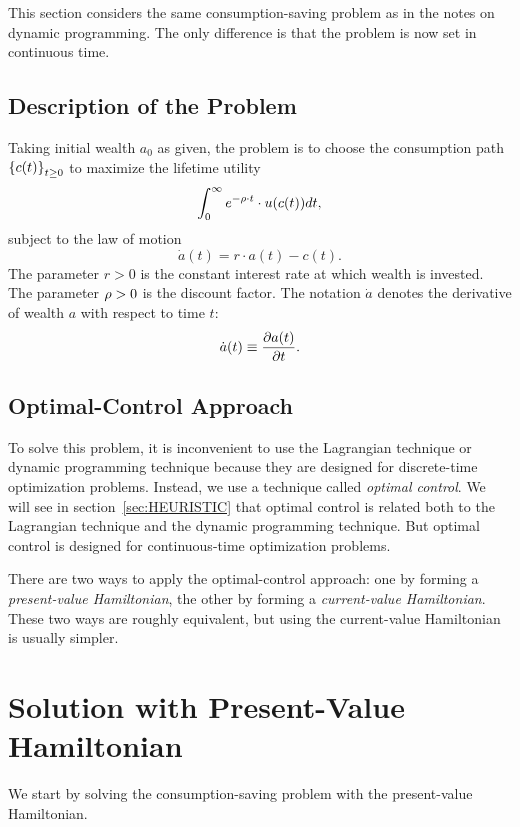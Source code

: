 \documentclass[letterpaper,12pt,leqno]{article}
\begin{document}
This section considers the same consumption-saving problem as in the notes on dynamic programming. The only difference is that the problem is now set in continuous time. 

\subsection{Description of the Problem}

Taking initial wealth $a_{0}$ as given, the problem is to choose the consumption path $\left\lbrace c(t) \right\rbrace_{t\geq 0}$ to maximize the lifetime utility
\begin{align}
\int_{0}^{\infty}e^{-\rho \cdot t}\cdot u(c(t)) dt \label{eq:cont},
\end{align}
subject to the law of motion
\begin{equation}
\dot{a}(t) = r\cdot a(t)-c(t).\label{eq:LAW}
\end{equation}  
The parameter $r>0$ is the constant interest rate at which wealth is invested. The parameter $\rho>0$ is the discount factor. The notation $\dot{a}$ denotes the derivative of wealth $a$ with respect to time $t$:
\[\dot{a}(t)\equiv \frac{\partial a(t)}{\partial t}.\] 

\subsection{Optimal-Control Approach}

To solve this problem, it is inconvenient to use the Lagrangian technique or dynamic programming technique because they are designed for discrete-time optimization problems. Instead, we use a technique called \textit{optimal control}. We will see in section~\ref{sec:HEURISTIC} that optimal control is related both to the Lagrangian technique and the dynamic programming technique. But optimal control is designed for continuous-time optimization problems. 

There are two ways to apply the optimal-control approach: one by forming a \textit{present-value Hamiltonian}, the other by forming a \textit{current-value Hamiltonian}. These two ways are roughly equivalent, but using the current-value Hamiltonian is usually simpler.

\section{Solution with Present-Value Hamiltonian}

We start by solving the consumption-saving problem with the present-value Hamiltonian.
\end{document}
